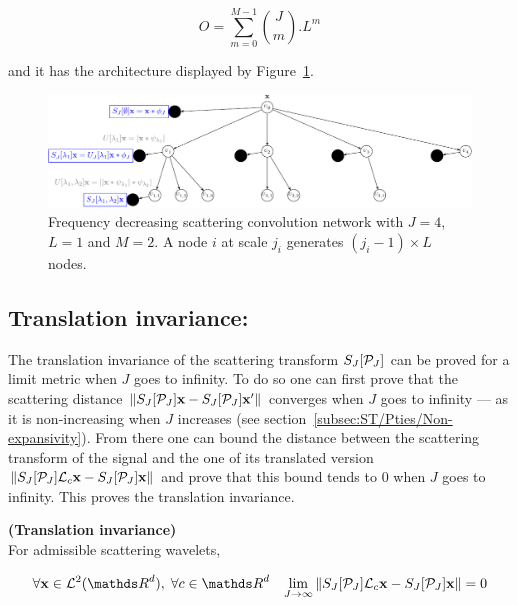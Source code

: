 \documentclass[a4paper,11pt]{report}
\begin{document}
			\begin{equation}
			  O = \sum_{m=0}^{M-1} \binom{J}{m} . L^{m}
			  \label{eq:ST number of node}
			\end{equation}

			and it has the architecture displayed by Figure~\ref{fig:SCN 2}. 
			
			\begin{figure}[h]
				\begin{center}
					\includegraphics[width=5in]{ST_freqDec_crop.pdf}
					\caption[Frequency decreasing scattering convolution network.]{\centering  Frequency decreasing scattering convolution network with $J=4$, $L=1$ and $M=2$. A node $i$ at scale $j_{i}$ generates $(j_{i}-1) \times L$ nodes. }
					\label{fig:SCN 2}
				\end{center}	
      \end{figure}
      
		\subsection{Translation invariance:}
			\label{subsec:ST/Pties/Translation}		
			The translation invariance of the scattering transform $S_{J}[\mathcal{P}_{J}]$ can be proved for a limit metric when $J$ goes to infinity. To do so one can first prove that the scattering distance $\left\lVert S_{J}[\mathcal{P}_{J}]{\bf x} - S_{J}[\mathcal{P}_{J}]{\bf x}' \right\rVert$ converges when $J$ goes to infinity --- as it is non-increasing when $J$ increases (see section~\ref{subsec:ST/Pties/Non-expansivity}). From there one can bound the distance between the scattering transform of the signal and the one of its translated version $\left\lVert S_{J}[\mathcal{P}_{J}]\mathcal{L}_{c}{\bf x} - S_{J}[\mathcal{P}_{J}]{\bf x} \right\rVert$ and prove that this bound tends to $0$ when $J$ goes to infinity. This proves the translation invariance.
			
			\begin{thm} \textbf{(Translation invariance)}\\
				For admissible scattering wavelets,
				
				\begin{equation}
					\forall \bfx \in \mcalL^{2}(\dsR^{d}), \; \forall c \in \dsR^{d} \;\;\; \lim_{J \rightarrow \infty} \norm{S_{J}[\mcalP_{J}]\mcalL_{c}\bfx - S_{J}[\mcalP_{J}]\bfx} = 0
					\label{eq:Tranlation invariance}
				\end{equation}
				\label{thm:Translation invariance}
			  
			\end{thm}
\end{document}

